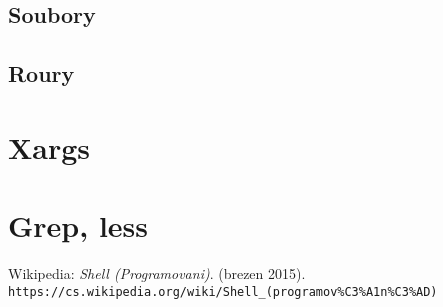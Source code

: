 \documentclass[12pt,a5paper]{article}
\begin{document}
\subsection{Soubory}
\subsection{Roury}
\section{Xargs}
\section{Grep, less}

\begin{thebibliography}{10}
   Wikipedia:
    \emph{Shell (Programovani)}. (brezen 2015).\\
    \lstinline|https://cs.wikipedia.org/wiki/Shell_(programov%C3%A1n%C3%AD)|
\end{thebibliography}
\end{document}
